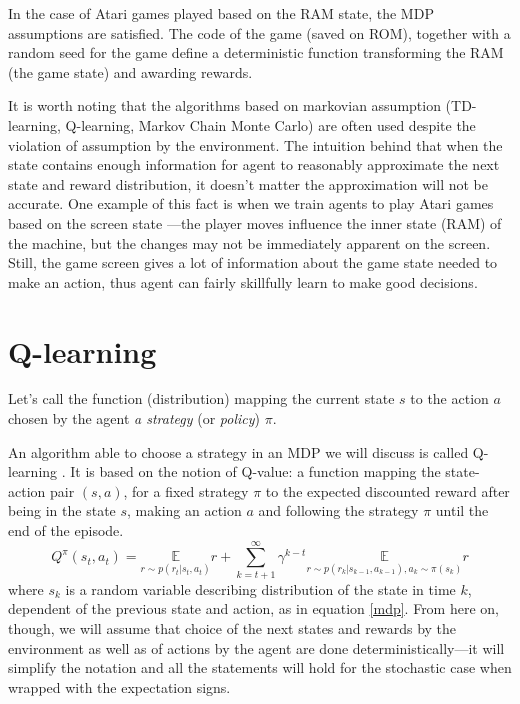 In the case of Atari games played based on the RAM state, the MDP assumptions are satisfied. The code of the game (saved on ROM), together with a random seed for the game define a deterministic function transforming the RAM (the game state) and awarding rewards.

It is worth noting that the algorithms based on markovian assumption (TD-learning, Q-learning, Markov Chain Monte Carlo) are often used despite the violation of assumption by the environment. The intuition behind that when the state contains enough information for agent to reasonably approximate the next state and reward distribution, it doesn't matter the approximation will not be accurate. One example of this fact is when we train agents to play Atari games based on the screen state \cite{nips-dqn}---the player moves influence the inner state (RAM) of the machine, but the changes may not be immediately apparent on the screen. Still, the game screen gives a lot of information about the game state needed to make an action, thus 
agent can fairly skillfully learn to make good decisions.

\section{Q-learning}\label{qlearning}
Let's call the function (distribution) mapping the current state $s$ to the action $a$ chosen by the agent \emph{a strategy} (or \emph{policy}) $\pi$.

An algorithm able to choose a strategy in an MDP we will discuss is called Q-learning \cite{qlearning, qlearning-old}. It is based on the notion of Q-value: a function mapping the state-action pair $(s, a)$, for a fixed strategy $\pi$ to the expected discounted reward after being in the state $s$, making an action $a$ and following the strategy $\pi$ until the end of the episode.
\begin{equation}\label{q-value}
  Q^\pi(s_t, a_t) = \underset{r\sim p(r_t | s_t, a_t)}{\mathbb{E}} r + \sum_{k=t+1}^\infty \gamma^{k-t}\underset{r\sim p(r_k|s_{k-1}, a_{k-1}), a_k\sim \pi(s_k)}{\mathbb{E}} r
\end{equation}
where $s_k$ is a random variable describing distribution of the state in time $k$, dependent of the previous state and action, as in equation \eqref{mdp}. From here on, though, we will assume that choice of the next states and rewards by the environment as well as of actions by the agent are done deterministically---it will simplify the notation and all the statements will hold for the stochastic case when wrapped with the expectation signs.

